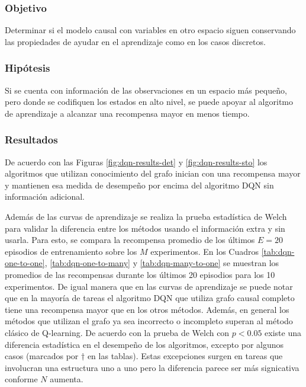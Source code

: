 \subsubsection{Objetivo}

Determinar si el modelo causal con variables  en otro espacio siguen conservando las propiedades
de ayudar en el aprendizaje como en los casos discretos.

\subsubsection{Hipótesis}

Si se cuenta con información de las observaciones
en un espacio más pequeño, pero donde se codifiquen
los estados en alto nivel, se puede apoyar 
al algoritmo de aprendizaje a alcanzar una recompensa
mayor en menos tiempo.

\subsubsection{Resultados}

De acuerdo con las Figuras \ref{fig:dqn-results-det} y \ref{fig:dqn-results-sto} los algoritmos que utilizan conocimiento del grafo inician con una recompensa mayor y mantienen esa medida de desempeño por encima del algoritmo DQN
sin información adicional. 

Además de las curvas de aprendizaje se realiza la prueba estadística de Welch para validar la diferencia entre los métodos usando el información extra y sin usarla. Para esto, se compara la recompensa promedio de los últimos $E = 20$ episodios
de entrenamiento sobre los $M$ experimentos. 
En los Cuadros \ref{tab:dqn-one-to-one}, \ref{tab:dqn-one-to-many} y \ref{tab:dqn-many-to-one} se muestran
los promedios de las recompensas durante los últimos 20 episodios para los 10 experimentos.
De igual manera que en las curvas de aprendizaje se puede notar que en la mayoría de tareas el algoritmo DQN que utiliza grafo causal completo tiene una recompensa mayor que en los otros métodos. Además, en general los métodos que utilizan el grafo ya sea incorrecto o incompleto superan al método clásico de Q-learning. De acuerdo con la prueba de Welch con $p < 0.05$ existe una diferencia estadística en el desempeño de los algoritmos, excepto por algunos casos (marcados por $\dagger$ en las tablas). Estas excepciones surgen en tareas que involucran una estructura uno a uno pero la diferencia parece ser más signicativa conforme $N$ aumenta.


